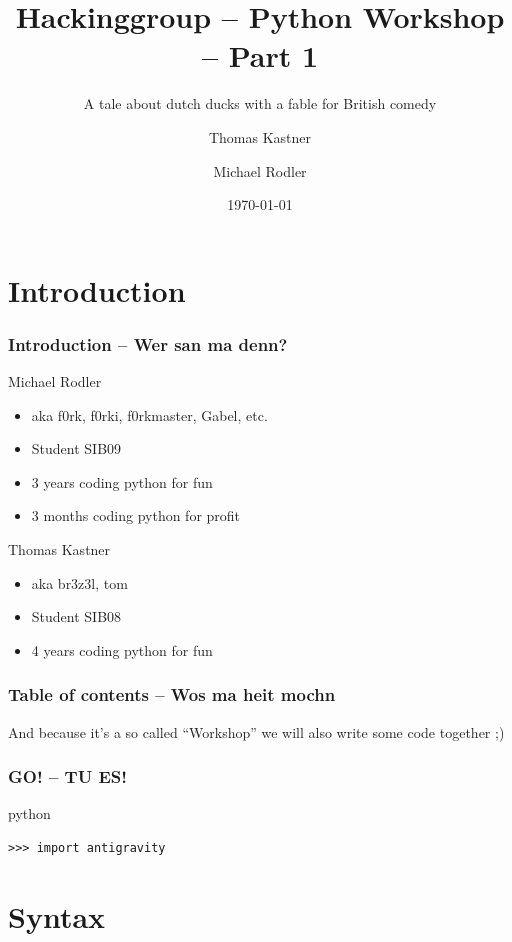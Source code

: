 \documentclass{beamer}
\title[Python Workshop]{Hackinggroup -- Python Workshop -- Part 1}
\subtitle{A tale about dutch ducks with a fable for British comedy}
\author[Thomas Kastner, Michael Rodler]{Thomas Kastner\and Michael Rodler}
\date{\today}
\begin{document}
\begin{frame}
    \titlepage
\end{frame}

\section*{Introduction}

\begin{frame}
    \frametitle{Introduction -- Wer san ma denn?}

    \begin{block}{Michael Rodler}
    \begin{itemize}
        \item aka f0rk, f0rki, f0rkmaster, Gabel, etc.
        \item Student SIB09
        \item 3 years coding python for fun
        \item 3 months coding python for profit
    \end{itemize}
    \end{block}

    \begin{block}{Thomas Kastner}
    \begin{itemize}
        \item aka br3z3l, tom
        \item Student SIB08
        \item 4 years coding python for fun
    \end{itemize}
    \end{block}
\end{frame}


\begin{frame}
    \frametitle{Table of contents -- Wos ma heit mochn}
    \tableofcontents
    And because it's a so called ``Workshop'' we will also write some code together ;)
\end{frame}

\begin{frame}[fragile]
	\frametitle{GO! -- TU ES!}
\pause
    \begin{exampleblock}{python}
    \begin{lstlisting}
>>> import antigravity
    \end{lstlisting}
    \end{exampleblock}
\end{frame}


\section{Syntax}
\end{document}
